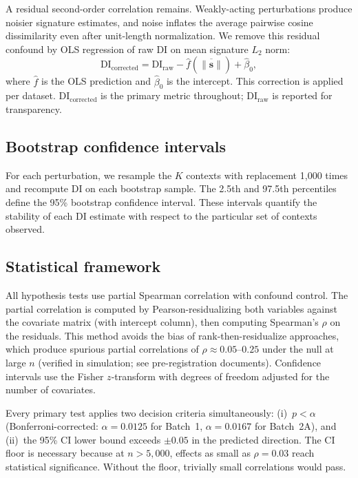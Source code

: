 \documentclass[11pt]{article}
\begin{document}
A residual second-order correlation remains.  Weakly-acting
perturbations produce noisier signature estimates, and noise inflates
the average pairwise cosine dissimilarity even after unit-length
normalization.  We remove this residual confound by OLS regression of
raw DI on mean signature $L_2$ norm:
\begin{equation}
\mathrm{DI}_{\mathrm{corrected}} = \mathrm{DI}_{\mathrm{raw}}
  - \hat{f}(\overline{\|\mathbf{s}\|}) + \hat{\beta}_0,
\label{eq:magnitude}
\end{equation}
where $\hat{f}$ is the OLS prediction and $\hat{\beta}_0$ is the
intercept.  This correction is applied per dataset.
$\mathrm{DI}_{\mathrm{corrected}}$ is the primary metric throughout;
$\mathrm{DI}_{\mathrm{raw}}$ is reported for transparency.

\subsection{Bootstrap confidence intervals}

For each perturbation, we resample the $K$ contexts with replacement
1{,}000 times and recompute DI on each bootstrap sample.  The 2.5th and
97.5th percentiles define the 95\% bootstrap confidence interval.  These
intervals quantify the stability of each DI estimate with respect to the
particular set of contexts observed.

\subsection{Statistical framework}

All hypothesis tests use partial Spearman correlation with confound
control.  The partial correlation is computed by Pearson-residualizing
both variables against the covariate matrix (with intercept column),
then computing Spearman's $\rho$ on the residuals.  This method avoids
the bias of rank-then-residualize approaches, which produce spurious
partial correlations of $\rho \approx 0.05$--$0.25$ under the null at
large $n$ (verified in simulation; see pre-registration documents).
Confidence intervals use the Fisher $z$-transform with degrees of
freedom adjusted for the number of covariates.

Every primary test applies two decision criteria simultaneously:
(i)~$p < \alpha$ (Bonferroni-corrected: $\alpha = 0.0125$ for Batch~1,
$\alpha = 0.0167$ for Batch~2A), and (ii)~the 95\% CI lower bound
exceeds $\pm 0.05$ in the predicted direction.  The CI floor is
necessary because at $n > 5{,}000$, effects as small as
$\rho = 0.03$ reach statistical significance.  Without the floor,
trivially small correlations would pass.
\end{document}
